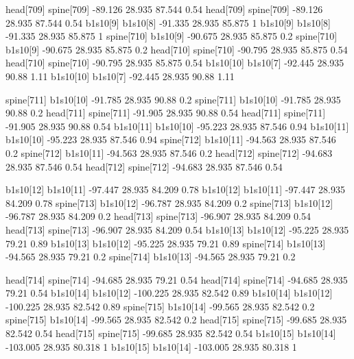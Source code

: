 head[709]    spine[709]    -89.126    28.935    87.544    0.54
head[709]    spine[709]    -89.126    28.935    87.544    0.54
b1s10[9]    b1s10[8]    -91.335    28.935    85.875    1
b1s10[9]    b1s10[8]    -91.335    28.935    85.875    1
spine[710]    b1s10[9]    -90.675    28.935    85.875    0.2
spine[710]    b1s10[9]    -90.675    28.935    85.875    0.2
head[710]    spine[710]    -90.795    28.935    85.875    0.54
head[710]    spine[710]    -90.795    28.935    85.875    0.54
b1s10[10]    b1s10[7]    -92.445    28.935    90.88    1.11
b1s10[10]    b1s10[7]    -92.445    28.935    90.88    1.11


spine[711]    b1s10[10]    -91.785    28.935    90.88    0.2
spine[711]    b1s10[10]    -91.785    28.935    90.88    0.2
head[711]    spine[711]    -91.905    28.935    90.88    0.54
head[711]    spine[711]    -91.905    28.935    90.88    0.54
b1s10[11]    b1s10[10]    -95.223    28.935    87.546    0.94
b1s10[11]    b1s10[10]    -95.223    28.935    87.546    0.94
spine[712]    b1s10[11]    -94.563    28.935    87.546    0.2
spine[712]    b1s10[11]    -94.563    28.935    87.546    0.2
head[712]    spine[712]    -94.683    28.935    87.546    0.54
head[712]    spine[712]    -94.683    28.935    87.546    0.54


b1s10[12]    b1s10[11]    -97.447    28.935    84.209    0.78
b1s10[12]    b1s10[11]    -97.447    28.935    84.209    0.78
spine[713]    b1s10[12]    -96.787    28.935    84.209    0.2
spine[713]    b1s10[12]    -96.787    28.935    84.209    0.2
head[713]    spine[713]    -96.907    28.935    84.209    0.54
head[713]    spine[713]    -96.907    28.935    84.209    0.54
b1s10[13]    b1s10[12]    -95.225    28.935    79.21    0.89
b1s10[13]    b1s10[12]    -95.225    28.935    79.21    0.89
spine[714]    b1s10[13]    -94.565    28.935    79.21    0.2
spine[714]    b1s10[13]    -94.565    28.935    79.21    0.2


head[714]    spine[714]    -94.685    28.935    79.21    0.54
head[714]    spine[714]    -94.685    28.935    79.21    0.54
b1s10[14]    b1s10[12]    -100.225    28.935    82.542    0.89
b1s10[14]    b1s10[12]    -100.225    28.935    82.542    0.89
spine[715]    b1s10[14]    -99.565    28.935    82.542    0.2
spine[715]    b1s10[14]    -99.565    28.935    82.542    0.2
head[715]    spine[715]    -99.685    28.935    82.542    0.54
head[715]    spine[715]    -99.685    28.935    82.542    0.54
b1s10[15]    b1s10[14]    -103.005    28.935    80.318    1
b1s10[15]    b1s10[14]    -103.005    28.935    80.318    1


